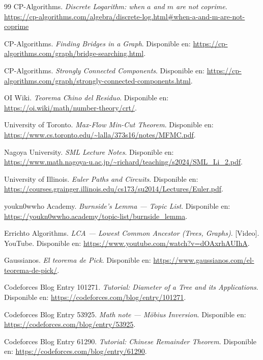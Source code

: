 \begin{thebibliography}{99}
CP-Algorithms. \emph{Discrete Logarithm: when $a$ and $m$ are not coprime}.\\
\url{https://cp-algorithms.com/algebra/discrete-log.html#when-a-and-m-are-not-coprime}

CP-Algorithms. \textit{Finding Bridges in a Graph}.
Disponible en: \url{https://cp-algorithms.com/graph/bridge-searching.html}.

CP-Algorithms. \textit{Strongly Connected Components}.
Disponible en: \url{https://cp-algorithms.com/graph/strongly-connected-components.html}.

OI Wiki. \textit{Teorema Chino del Residuo}.
Disponible en: \url{https://oi.wiki/math/number-theory/crt/}.

University of Toronto. \textit{Max-Flow Min-Cut Theorem}.
Disponible en: \url{https://www.cs.toronto.edu/~lalla/373s16/notes/MFMC.pdf}.

Nagoya University. \textit{SML Lecture Notes}.
Disponible en: \url{https://www.math.nagoya-u.ac.jp/~richard/teaching/s2024/SML_Li_2.pdf}.

University of Illinois. \textit{Euler Paths and Circuits}.
Disponible en: \url{https://courses.grainger.illinois.edu/cs173/su2014/Lectures/Euler.pdf}.

youkn0wwho Academy. \textit{Burnside's Lemma — Topic List}.
Disponible en: \url{https://youkn0wwho.academy/topic-list/burnside_lemma}.

Errichto Algorithms. \textit{LCA — Lowest Common Ancestor (Trees, Graphs)}.
[Video]. YouTube.
Disponible en: \url{https://www.youtube.com/watch?v=dOAxrhAUIhA}.

Gaussianos. \textit{El teorema de Pick}.
Disponible en: \url{https://www.gaussianos.com/el-teorema-de-pick/}.

Codeforces Blog Entry 101271. \textit{Tutorial: Diameter of a Tree and its Applications}.
Disponible en: \url{https://codeforces.com/blog/entry/101271}.

Codeforces Blog Entry 53925. \textit{Math note — Möbius Inversion}.
Disponible en: \url{https://codeforces.com/blog/entry/53925}.

Codeforces Blog Entry 61290. \textit{Tutorial: Chinese Remainder Theorem}.
Disponible en: \url{https://codeforces.com/blog/entry/61290}.


\end{thebibliography}
